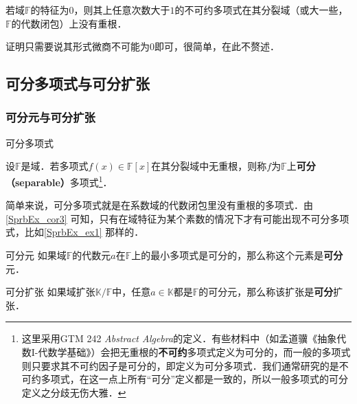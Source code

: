 \begin{corollary}{}\label{SprbEx_cor3}

若域$\mathbb{F}$的特征为$0$，则其上任意次数大于$1$的不可约多项式在其分裂域（或大一些，$\mathbb{F}$的代数闭包）上没有重根．

\end{corollary}

证明只需要说其形式微商不可能为$0$即可，很简单，在此不赘述．




\subsection{可分多项式与可分扩张}



\subsubsection{可分元与可分扩张}



\begin{definition}{可分多项式}\label{SprbEx_def2}

设$\mathbb{F}$是域．若多项式$f(x)\in\mathbb{F}[x]$在其分裂域中无重根，则称$f$为$\mathbb{F}$上\textbf{可分（separable）}多项式\footnote{这里采用GTM 242 \textsl{Abstract Algebra}的定义．有些材料中（如孟道骥《抽象代数I-代数学基础》）会把无重根的\textbf{不可约}多项式定义为可分的，而一般的多项式则只要求其不可约因子是可分的，即定义为可分多项式．我们通常研究的是不可约多项式，在这一点上所有“可分”定义都是一致的，所以一般多项式的可分定义之分歧无伤大雅．}．


\end{definition}

简单来说，可分多项式就是在系数域的代数闭包里没有重根的多项式．由\autoref{SprbEx_cor3} 可知，只有在域特征为某个素数的情况下才有可能出现不可分多项式，比如\autoref{SprbEx_ex1} 那样的．


\begin{definition}{可分元}
如果域$\mathbb{F}$的代数元$a$在$\mathbb{F}$上的最小多项式是可分的，那么称这个元素是\textbf{可分}元．
\end{definition}

\begin{definition}{可分扩张}
如果域扩张$\mathbb{K}/\mathbb{F}$中，任意$a\in\mathbb{K}$都是$\mathbb{F}$的可分元，那么称该扩张是\textbf{可分}扩张．
\end{definition}



